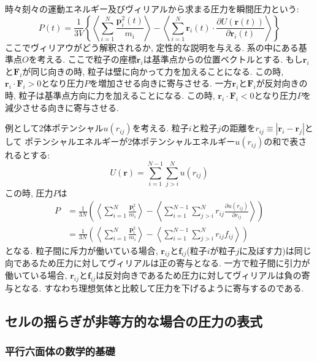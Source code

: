 時々刻々の運動エネルギー及びヴィリアルから求まる圧力を瞬間圧力という:
\begin{equation}
 P(t)
=\frac{1}{3V}
 \left\{
         \left\langle \sum_{i=1}^{N} \frac{\bm{p}_{i}^{2}(t)}{m_{i}} \right\rangle
        -\left\langle \sum_{i=1}^{N} \bm{r}_{i}(t) \cdot \frac{\partial U(\bm{r}(t))}{\partial \bm{r}_{i}(t)} \right\rangle
 \right\}
\end{equation}
ここでヴィリアウがどう解釈されるか, 定性的な説明を与える.
系の中にある基準点$O$を考える.
ここで粒子の座標$\bm{r}_{i}$は基準点からの位置ベクトルとする.
もし$\bm{r}_{i}$と$\bm{F}_{i}$が同じ向きの時, 粒子は壁に向かって力を加えることになる.
この時, $\bm{r}_{i} \cdot \bm{F}_{i} > 0$となり圧力$P$を増加させる向きに寄与させる.
一方$\bm{r}_{i}$と$\bm{F}_{i}$が反対向きの時, 粒子は基準点方向に力を加えることになる.
この時, $\bm{r}_{i} \cdot \bm{F}_{i} < 0$となり圧力$P$を減少させる向きに寄与させる.

例として2体ポテンシャル$u(r_{ij})$を考える.
粒子$i$と粒子$j$の距離を$r_{ij} \equiv |\bm{r}_{i} - \bm{r}_{j}|$として
ポテンシャルエネルギーが2体ポテンシャルエネルギー$u(r_{ij})$の和で表されるとする:
\begin{equation}
 U(\bm{r})
=\sum_{i=1}^{N-1}\sum_{j > i}^{N} u(r_{ij})
\end{equation}
この時, 圧力$P$は
\begin{align}
  P
&=\frac{1}{3N}
  \left(
         \left\langle \sum_{i=1}^{N} \frac{\bm{p}_{i}^{2}}{m_{i}} \right\rangle
        -\left\langle \sum_{i=1}^{N-1} \sum_{j>i}^{N} r_{ij} \frac{\partial u(r_{ij})}{\partial r_{ij}} \right\rangle
  \right)
  \\
&=\frac{1}{3N}
  \left(
         \left\langle \sum_{i=1}^{N} \frac{\bm{p}_{i}^{2}}{m_{i}} \right\rangle
        -\left\langle \sum_{i=1}^{N-1} \sum_{j>i}^{N} r_{ij} f_{ij} \right\rangle
  \right)
\end{align}
となる.
粒子間に斥力が働いている場合,
$\bm{r}_{ij}$と$\bm{f}_{ij}$(粒子$i$が粒子$j$に及ぼす力)は同じ向であるため圧力に対してヴィリアルは正の寄与となる.
一方で粒子間に引力が働いている場合,
$\bm{r}_{ij}$と$\bm{f}_{ij}$は反対向きであるため圧力に対してヴィリアルは負の寄与となる.
すなわち理想気体と比較して圧力を下げるように寄与するのである.

\subsection{セルの揺らぎが非等方的な場合の圧力の表式}
\subsubsection{平行六面体の数学的基礎}

